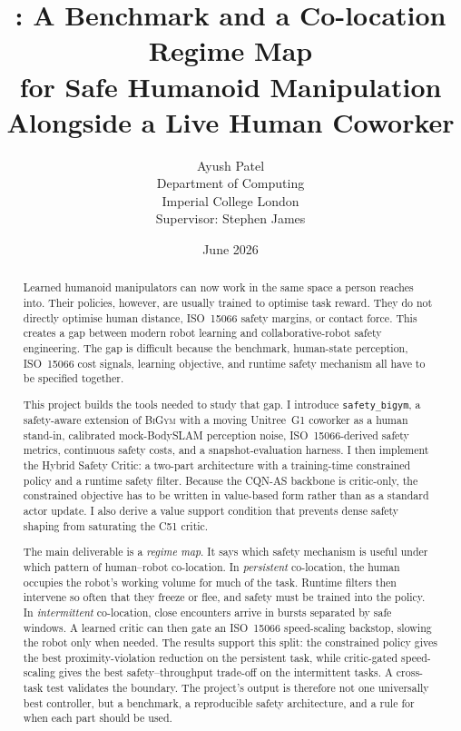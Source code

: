 \documentclass[11pt,a4paper]{report}
\title{\sbigym{}: A Benchmark and a Co-location Regime Map\\
       for Safe Humanoid Manipulation\\
       Alongside a Live Human Coworker}
\author{Ayush Patel \\
        Department of Computing \\
        Imperial College London \\[1ex]
        Supervisor: Stephen James}
\date{June 2026}
\newcommand{\iso}{ISO~15066}
\newcommand{\bigym}{\textsc{BiGym}}
\newcommand{\sbigym}{\texttt{safety\_bigym}}
\newcommand{\cqnas}{CQN-AS}
\newcommand{\bodyslampp}{BodySLAM\nolinebreak[4]\hspace{-.05em}\raisebox{.2ex}{\scriptsize ++}}
\begin{document}
\maketitle

\begin{abstract}
\noindent
Learned humanoid manipulators can now work in the same space a person
reaches into. Their policies, however, are usually trained to optimise
task reward. They do not directly optimise human distance,
\iso{} safety margins, or contact force. This creates a gap between
modern robot learning and collaborative-robot safety engineering.
The gap is difficult because the benchmark, human-state perception,
\iso{} cost signals, learning objective, and runtime safety mechanism
all have to be specified together.

This project builds the tools needed to study that gap. I introduce
\sbigym{}, a safety-aware extension of \bigym{} with a moving
Unitree~G1 coworker as a human stand-in, calibrated mock-\bodyslampp{}
perception noise, \iso{}-derived safety metrics, continuous safety
costs, and a snapshot-evaluation harness. I then implement the Hybrid
Safety Critic: a two-part architecture with a training-time constrained
policy and a runtime safety filter. Because the \cqnas{} backbone is
critic-only, the constrained objective has to be written in value-based
form rather than as a standard actor update. I also derive a value
support condition that prevents dense safety shaping from saturating
the C51 critic.

The main deliverable is a \emph{regime map}. It says which safety
mechanism is useful under which pattern of human--robot co-location.
In \emph{persistent} co-location, the human occupies the robot's
working volume for much of the task. Runtime filters then intervene so
often that they freeze or flee, and safety must be trained into the
policy. In \emph{intermittent} co-location, close encounters arrive in
bursts separated by safe windows. A learned critic can then gate an
\iso{} speed-scaling backstop, slowing the robot only when needed. The
results support this split: the constrained policy gives the best
proximity-violation reduction on the persistent task, while critic-gated
speed-scaling gives the best safety--throughput trade-off on the
intermittent tasks. A cross-task test validates the boundary. The
project's output is therefore not one universally best controller, but
a benchmark, a reproducible safety architecture, and a rule for when
each part should be used.
\end{abstract}
\end{document}
